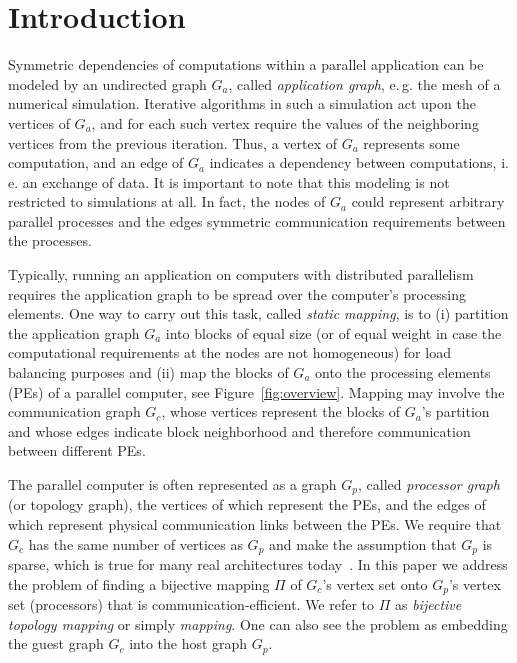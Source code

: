 \documentclass[pdftex]{llncs}
\newcommand{\eg}{e.\,g.\xspace}
\newcommand{\ie}{i.\,e.\xspace}
\begin{document}
\section{Introduction}
\label{sec:intro}
Symmetric dependencies of computations within a parallel application can be modeled by an
undirected graph $G_a$, called \emph{application graph}, \eg the
mesh of a numerical simulation. Iterative algorithms in such a
simulation act upon the vertices of $G_a$, and for each such vertex
require the values of the neighboring vertices from the previous
iteration. Thus, a vertex of $G_a$ represents some computation, and an
edge of $G_a$ indicates a dependency between computations, \ie
an exchange of data. It is important to note that this modeling is not restricted 
to simulations at all. In fact, the nodes of $G_a$ could represent arbitrary parallel processes
and the edges symmetric communication requirements between the processes.

Typically, running an application on computers with distributed parallelism requires the application graph to be spread over 
the computer's processing elements. One
way to carry out this task, called \emph{static mapping}, is to (i)
partition the application graph $G_{a}$ into blocks of equal size (or of equal weight
in case the computational requirements at the nodes are not homogeneous) for
load balancing purposes and (ii) map the blocks of $G_{a}$ onto the
processing elements (PEs) of a parallel computer, see
Figure~\ref{fig:overview}. 
Mapping may involve the communication
graph $G_{c}$, whose vertices represent the blocks of $G_{a}$'s
partition and whose edges indicate block neighborhood and therefore
communication between different PEs. 

The parallel computer is often represented as a graph $G_p$, called \emph{processor
  graph} (or topology graph), the vertices of which represent the PEs,
and the edges of which represent physical communication links between
the PEs. We require that $G_c$ has the same number of vertices as
$G_p$ and make the assumption that $G_p$ is sparse,
which is true for many real architectures today~\cite{top500-13-06}.
In this paper we address the problem of finding a bijective mapping
$\Pi$ of $G_c$'s vertex set onto $G_p$'s vertex set
(processors) that is communication-efficient. We refer to $\Pi$ as
\emph{bijective topology mapping} or simply \emph{mapping}. One can also
see the problem as embedding the guest graph $G_c$ into the host graph $G_p$.
\end{document}
